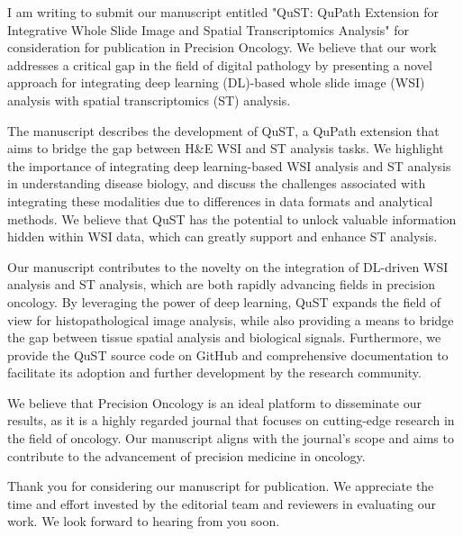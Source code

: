 \documentclass[10pt,stdletter,dateno]{newlfm}
\begin{document}
	\begin{newlfm}
		I am writing to submit our manuscript entitled "QuST: QuPath Extension for Integrative Whole Slide Image and Spatial Transcriptomics Analysis" for consideration for publication in Precision Oncology. We believe that our work addresses a critical gap in the field of digital pathology by presenting a novel approach for integrating deep learning (DL)-based whole slide image (WSI) analysis with spatial transcriptomics (ST) analysis.
		
		The manuscript describes the development of QuST, a QuPath extension that aims to bridge the gap between H\&E WSI and ST analysis tasks. We highlight the importance of integrating deep learning-based WSI analysis and ST analysis in understanding disease biology, and discuss the challenges associated with integrating these modalities due to differences in data formats and analytical methods. We believe that QuST has the potential to unlock valuable information hidden within WSI data, which can greatly support and enhance ST analysis.
		
		Our manuscript contributes to the novelty on the integration of DL-driven WSI analysis and ST analysis, which are both rapidly advancing fields in precision oncology. By leveraging the power of deep learning, QuST expands the field of view for histopathological image analysis, while also providing a means to bridge the gap between tissue spatial analysis and biological signals. Furthermore, we provide the QuST source code on GitHub and comprehensive documentation to facilitate its adoption and further development by the research community.
		
		We believe that Precision Oncology is an ideal platform to disseminate our results, as it is a highly regarded journal that focuses on cutting-edge research in the field of oncology. Our manuscript aligns with the journal's scope and aims to contribute to the advancement of precision medicine in oncology.
		
		Thank you for considering our manuscript for publication. We appreciate the time and effort invested by the editorial team and reviewers in evaluating our work. We look forward to hearing from you soon.
		
	\end{newlfm}
\end{document}
